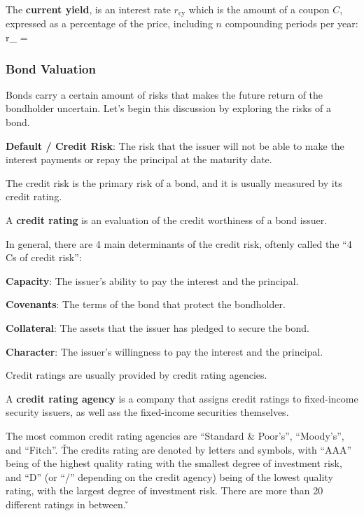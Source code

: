 The \textbf{current yield}, is an interest rate $r_{\text{cy}}$ which is the amount of a coupon $C$, expressed as a
percentage of the price, including $n$ compounding periods per year:
\bse
r_{} = 
\ese
\ed

\subsubsection{Bond Valuation}

Bonds carry a certain amount of risks that makes the future return of the bondholder uncertain. Let's begin this
discussion by exploring the risks of a bond.
\bit
\item \textbf{Default / Credit Risk}: The risk that the issuer will not be able to make the interest payments or repay
the principal at the maturity date.
\eit

The credit risk is the primary risk of a bond, and it is usually measured by its credit rating.

A \textbf{credit rating} is an evaluation of the credit worthiness of a bond issuer.
\ed

In general, there are 4 main determinants of the credit risk, oftenly called the ``4 Cs of credit risk'':
\bit
\item \textbf{Capacity}: The issuer's ability to pay the interest and the principal.
\item \textbf{Covenants}: The terms of the bond that protect the bondholder.
\item \textbf{Collateral}: The assets that the issuer has pledged to secure the bond.
\item \textbf{Character}: The issuer's willingness to pay the interest and the principal.
\eit

Credit ratings are usually provided by credit rating agencies.

A \textbf{credit rating agency} is a company that assigns credit ratings to fixed-income security issuers, as well ass
the fixed-income securities themselves.
\ed

The most common credit rating agencies are ``Standard \& Poor's'', ``Moody's'', and ``Fitch''. \v

The credits rating are denoted by letters and symbols, with ``AAA'' being of the highest quality rating with the
smallest degree of investment risk, and ``D'' (or ``/'' depending on the credit agency) being of the lowest quality
rating, with the largest degree of investment risk. There are more than 20 different ratings in between. \v

